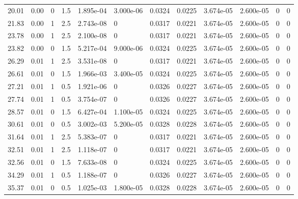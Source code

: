 \documentclass[preview]{standalone}
\begin{document}
{{\begin{tabular}{L{1.2cm}C{1.2cm} C{0.3cm}C{0.5cm} C{1.4cm}C{1.4cm} C{1.4cm}C{1.4cm} C{1.6cm}C{1.6cm} C{1.6cm}C{1.6cm}}
  20.01  &  0.00  & 0     & 1.5 &  1.895e-04  & 3.000e-06  &  0.0324&   0.0225& 3.674e-05 & 2.600e-05   &  0 & 0  \\ 
  21.83  &  0.00  & 1     & 2.5 &  2.743e-08  & 0  &  0.0317&   0.0221& 3.674e-05 & 2.600e-05   &  0 & 0  \\ 
  23.78  &  0.00  & 1     & 2.5 &  2.100e-08  & 0  &  0.0317&   0.0221& 3.674e-05 & 2.600e-05   &  0 & 0  \\ 
  23.82  &  0.00  & 0     & 1.5 &  5.217e-04  & 9.000e-06  &  0.0324&   0.0225& 3.674e-05 & 2.600e-05   &  0 & 0  \\ 
  26.29  &  0.01  & 1     & 2.5 &  3.531e-08  & 0  &  0.0317&   0.0221& 3.674e-05 & 2.600e-05   &  0 & 0  \\ 
  26.61  &  0.01  & 0     & 1.5 &  1.966e-03  & 3.400e-05  &  0.0324&   0.0225& 3.674e-05 & 2.600e-05   &  0 & 0  \\ 
  27.21  &  0.01  & 1     & 0.5 &  1.921e-06  & 0  &  0.0326&   0.0227& 3.674e-05 & 2.600e-05   &  0 & 0  \\ 
  27.74  &  0.01  & 1     & 0.5 &  3.754e-07  & 0  &  0.0326&   0.0227& 3.674e-05 & 2.600e-05   &  0 & 0  \\ 
  28.57  &  0.01  & 0     & 1.5 &  6.427e-04  & 1.100e-05  &  0.0324&   0.0225& 3.674e-05 & 2.600e-05   &  0 & 0  \\ 
  30.61  &  0.01  & 0     & 0.5 &  3.002e-03  & 5.200e-05  &  0.0328&   0.0228& 3.674e-05 & 2.600e-05   &  0 & 0  \\ 
  31.64  &  0.01  & 1     & 2.5 &  5.383e-07  & 0  &  0.0317&   0.0221& 3.674e-05 & 2.600e-05   &  0 & 0  \\ 
  32.51  &  0.01  & 1     & 2.5 &  1.118e-07  & 0  &  0.0317&   0.0221& 3.674e-05 & 2.600e-05   &  0 & 0  \\ 
  32.56  &  0.01  & 0     & 1.5 &  7.633e-08  & 0  &  0.0324&   0.0225& 3.674e-05 & 2.600e-05   &  0 & 0  \\ 
  34.29  &  0.01  & 1     & 0.5 &  1.188e-07  & 0  &  0.0326&   0.0227& 3.674e-05 & 2.600e-05   &  0 & 0  \\ 
  35.37  &  0.01  & 0     & 0.5 &  1.025e-03  & 1.800e-05  &  0.0328&   0.0228& 3.674e-05 & 2.600e-05   &  0 & 0  \\ 
\hline 
\end{tabular} 

}}
\end{document}
